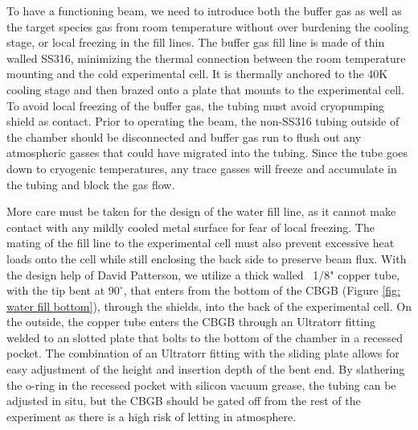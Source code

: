To have a functioning beam, we need to introduce both the buffer gas as well as the target species gas from room temperature without over burdening the cooling stage, or local freezing in the fill lines. The buffer gas fill line is made of thin walled SS316, minimizing the thermal connection between the room temperature mounting and the cold experimental cell. It is thermally anchored to the 40K cooling stage and then brazed onto a plate that mounts to the experimental cell. To avoid local freezing of the buffer gas, the tubing must avoid cryopumping shield as contact. Prior to operating the beam, the non-SS316 tubing outside of the chamber should be disconnected and buffer gas run to flush out any atmospheric gasses that could have migrated into the tubing. Since the tube goes down to cryogenic temperatures, any trace gasses will freeze and accumulate in the tubing and block the gas flow.

More care must be taken for the design of the water fill line, as it cannot make contact with any mildly cooled metal surface for fear of local freezing. The mating of the fill line to the experimental cell must also prevent excessive heat loads onto the cell while still enclosing the back side to preserve beam flux. With the design help of David Patterson, we utilize a thick walled ~1/8" copper tube, with the tip bent at $90^\circ$, that enters from the bottom of the CBGB (Figure \ref{fig: water fill bottom}), through the shields, into the back of the experimental cell. On the outside, the copper tube enters the CBGB through an Ultratorr fitting welded to an slotted plate that bolts to the bottom of the chamber in a recessed pocket. The combination of an Ultratorr fitting with the sliding plate allows for easy adjustment of the height and insertion depth of the bent end. By slathering the o-ring in the recessed pocket with silicon vacuum grease, the tubing can be adjusted in situ, but the CBGB should be gated off from the rest of the experiment as there is a high risk of letting in atmosphere.

